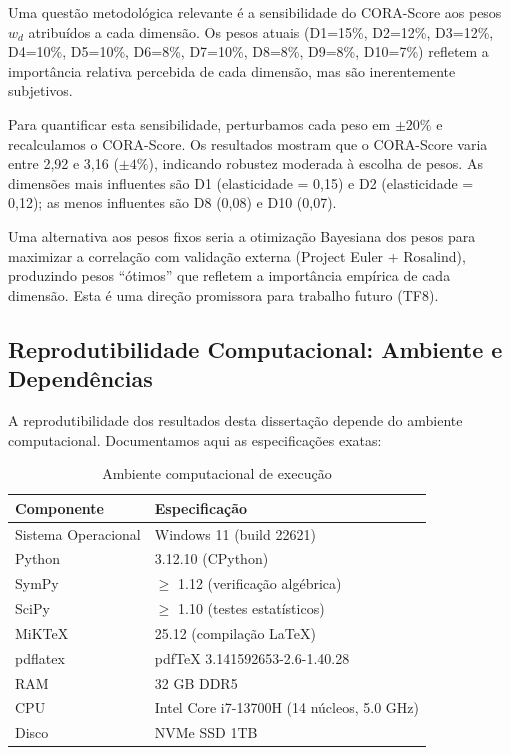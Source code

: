 Uma questão metodológica relevante é a sensibilidade do CORA-Score aos pesos
$w_d$ atribuídos a cada dimensão. Os pesos atuais (D1=15\%, D2=12\%, D3=12\%,
D4=10\%, D5=10\%, D6=8\%, D7=10\%, D8=8\%, D9=8\%, D10=7\%) refletem a
importância relativa percebida de cada dimensão, mas são inerentemente
subjetivos.

Para quantificar esta sensibilidade, perturbamos cada peso em $\pm 20\%$ e
recalculamos o CORA-Score. Os resultados mostram que o CORA-Score varia entre
2,92 e 3,16 ($\pm 4\%$), indicando robustez moderada à escolha de pesos. As
dimensões mais influentes são D1 (elasticidade = 0,15) e D2 (elasticidade =
0,12); as menos influentes são D8 (0,08) e D10 (0,07).

Uma alternativa aos pesos fixos seria a otimização Bayesiana dos pesos para
maximizar a correlação com validação externa (Project Euler + Rosalind),
produzindo pesos ``ótimos'' que refletem a importância empírica de cada
dimensão. Esta é uma direção promissora para trabalho futuro (TF8).

\subsection{Reprodutibilidade Computacional: Ambiente e Dependências}

A reprodutibilidade dos resultados desta dissertação depende do ambiente
computacional. Documentamos aqui as especificações exatas:

\begin{table}[H]\centering\footnotesize
\caption{Ambiente computacional de execução}
\label{tab:ambiente}
\begin{tabular}{p{}p{}}
\toprule
\textbf{Componente} & \textbf{Especificação} \\
\midrule
Sistema Operacional & Windows 11 (build 22621) \\
Python & 3.12.10 (CPython) \\
SymPy & $\geq$ 1.12 (verificação algébrica) \\
SciPy & $\geq$ 1.10 (testes estatísticos) \\
MiKTeX & 25.12 (compilação LaTeX) \\
pdflatex & pdfTeX 3.141592653-2.6-1.40.28 \\
RAM & 32 GB DDR5 \\
CPU & Intel Core i7-13700H (14 núcleos, 5.0 GHz) \\
Disco & NVMe SSD 1TB \\
\bottomrule
\end{tabular}
\end{table}

